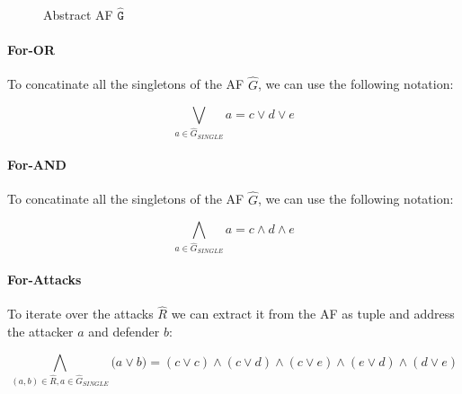 \begin{figure}[h]
    \centering
    \caption{Abstract AF $\mathtt{\hat{G}}$}
    \label{af:backgroundSATExample1}
\end{figure}

\paragraph{For-OR} To concatinate all the singletons of the AF $\hat{G}$, we can use the following notation:

$$
\bigvee_{a \in \hat{G}_{\!S\!I\!N\!G\!L\!E}} a = c \lor d \lor e
$$

\paragraph{For-AND} To concatinate all the singletons of the AF $\hat{G}$, we can use the following notation:

$$
\bigwedge_{a \in \hat{G}_{\!S\!I\!N\!G\!L\!E}} a = c \land d \land e
$$

\paragraph{For-Attacks} To iterate over the attacks $\hat{R}$ we can extract it from the AF as tuple and address the attacker $a$ and defender $b$:

$$
\bigwedge_{(a, b) \in \hat{R}, a\in \hat{G}_{\!S\!I\!N\!G\!L\!E}} \big( a \lor b \big) = (c \lor c) \land
(c \lor d) \land (c \lor e) \land (e \lor d) \land (d \lor e)
$$

